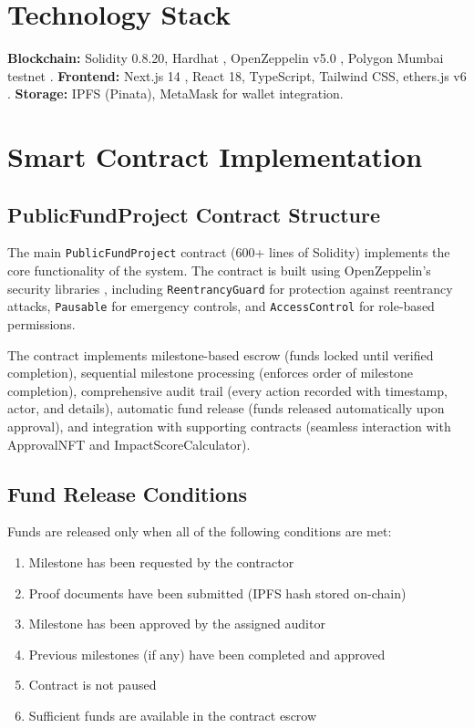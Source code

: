 \documentclass[12pt,a4wide]{report}
\theoremstyle{plain}
\theoremstyle{definition}
\theoremstyle{remark}
\begin{document}
\section{Technology Stack}

\textbf{Blockchain:} Solidity 0.8.20, Hardhat \cite{hardhat}, OpenZeppelin v5.0 \cite{openzeppelin}, Polygon Mumbai testnet \cite{polygon}. \textbf{Frontend:} Next.js 14 \cite{nextjs}, React 18, TypeScript, Tailwind CSS, ethers.js v6 \cite{ethers}. \textbf{Storage:} IPFS \cite{ipfs} (Pinata), MetaMask \cite{metamask} for wallet integration.

\section{Smart Contract Implementation}

\subsection{PublicFundProject Contract Structure}

The main \texttt{PublicFundProject} contract (600+ lines of Solidity) implements the core functionality of the system. The contract is built using OpenZeppelin's security libraries \cite{openzeppelin}, including \texttt{ReentrancyGuard} for protection against reentrancy attacks, \texttt{Pausable} for emergency controls, and \texttt{AccessControl} for role-based permissions.

The contract implements milestone-based escrow (funds locked until verified completion), sequential milestone processing (enforces order of milestone completion), comprehensive audit trail (every action recorded with timestamp, actor, and details), automatic fund release (funds released automatically upon approval), and integration with supporting contracts (seamless interaction with ApprovalNFT and ImpactScoreCalculator).

\subsection{Fund Release Conditions}

Funds are released only when all of the following conditions are met:
\begin{enumerate}
    \item Milestone has been requested by the contractor
    \item Proof documents have been submitted (IPFS hash stored on-chain)
    \item Milestone has been approved by the assigned auditor
    \item Previous milestones (if any) have been completed and approved
    \item Contract is not paused
    \item Sufficient funds are available in the contract escrow
\end{enumerate}
\end{document}

